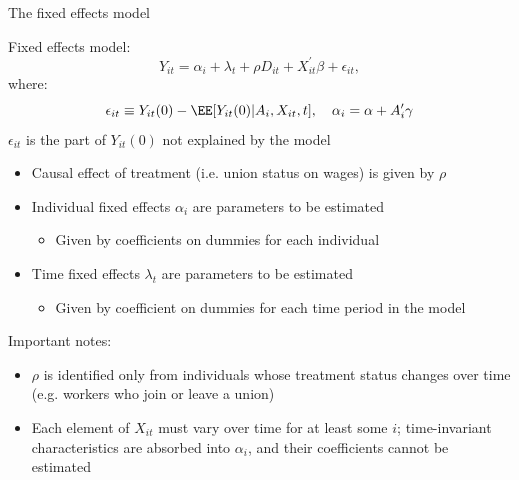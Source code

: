 \documentclass[compress, 8pt]{beamer}
\begin{document}
\begin{frame}{The fixed effects model}

Fixed effects model:
\begin{equation*}
    Y_{it} = \alpha_i + \lambda_t + \rho D_{it} + X_{it}^\prime \beta + \epsilon_{it},
\end{equation*}
where:
\begin{equation*}
    \epsilon_{it} \equiv Y_{it} (0) - \EE [Y_{it} (0) \vert A_i, X_{it}, t], \quad \alpha_i = \alpha + A_i^\prime \gamma
\end{equation*}
{\color{DarkGray}$\epsilon_{it}$ is the part of $Y_{it}(0)$ not explained by the model}

\vspace{3ex}
\begin{itemize}
    \item Causal effect of treatment (i.e. union status on wages) is given by $\rho$
    \item Individual fixed effects $\alpha_i$ are parameters to be estimated
    \begin{itemize}
        \item Given by coefficients on dummies for each individual
    \end{itemize}
    \item Time fixed effects $\lambda_t$ are parameters to be estimated
    \begin{itemize}
        \item Given by coefficient on dummies for each time period in the model
    \end{itemize}
\end{itemize}

\vspace{3ex}
Important notes:
\begin{itemize}
    \item $\rho$ is identified only from individuals whose treatment status changes over time (e.g. workers who join or leave a union)
    \item Each element of $X_{it}$ must vary over time for at least some $i$; time-invariant characteristics are absorbed into $\alpha_i$, and their coefficients cannot be estimated
\end{itemize}

\end{frame}
\end{document}
